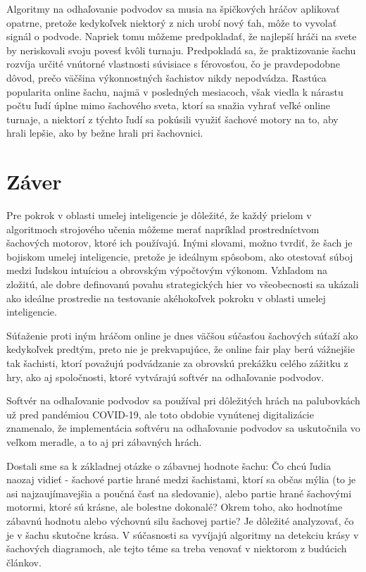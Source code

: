 \documentclass[10pt,twoside,slovak,a4paper]{article}
\begin{document}
Algoritmy na odhaľovanie podvodov sa musia na špičkových hráčov aplikovať opatrne, pretože kedykoľvek niektorý z nich urobí nový ťah, môže to vyvolať signál o podvode. Napriek tomu môžeme predpokladať, že najlepší hráči na svete by neriskovali svoju povesť kvôli turnaju. Predpokladá sa, že praktizovanie šachu rozvíja určité vnútorné vlastnosti súvisiace s férovosťou, čo je pravdepodobne dôvod, prečo väčšina výkonnostných šachistov nikdy nepodvádza. Rastúca popularita online šachu, najmä v posledných mesiacoch, však viedla k nárastu počtu ľudí úplne mimo šachového sveta, ktorí sa snažia vyhrať veľké online turnaje, a niektorí z týchto ľudí sa pokúsili využiť šachové motory na to, aby hrali lepšie, ako by bežne hrali pri šachovnici.







\section{Záver}

Pre pokrok v oblasti umelej inteligencie je dôležité, že každý prielom v algoritmoch strojového učenia môžeme merať napríklad prostredníctvom šachových motorov, ktoré ich používajú. Inými slovami, možno tvrdiť, že šach je bojiskom umelej inteligencie, pretože je ideálnym spôsobom, ako otestovať súboj medzi ľudskou intuíciou a obrovským výpočtovým výkonom. Vzhľadom na zložitú, ale dobre definovanú povahu strategických hier vo všeobecnosti sa ukázali ako ideálne prostredie na testovanie akéhokoľvek pokroku v oblasti umelej inteligencie.

Súťaženie proti iným hráčom online je dnes väčšou súčasťou šachových súťaží ako kedykoľvek predtým, preto nie je prekvapujúce, že online fair play berú vážnejšie tak šachisti, ktorí považujú podvádzanie za obrovskú prekážku celého zážitku z hry, ako aj spoločnosti, ktoré vytvárajú softvér na odhaľovanie podvodov.

Softvér na odhaľovanie podvodov sa používal pri dôležitých hrách na palubovkách už pred pandémiou COVID-19, ale toto obdobie vynútenej digitalizácie znamenalo, že implementácia softvéru na odhaľovanie podvodov sa uskutočnila vo veľkom meradle, a to aj pri zábavných hrách.

Dostali sme sa k základnej otázke o zábavnej hodnote šachu: Čo chcú ľudia naozaj vidieť - šachové partie hrané medzi šachistami, ktorí sa občas mýlia (to je asi najzaujímavejšia a poučná časť na sledovanie), alebo partie hrané šachovými motormi, ktoré sú krásne, ale bolestne dokonalé? Okrem toho, ako hodnotíme zábavnú hodnotu alebo výchovnú silu šachovej partie? Je dôležité analyzovať, čo je v šachu skutočne krása. V súčasnosti sa vyvíjajú algoritmy na detekciu krásy v šachových diagramoch, ale tejto téme sa treba venovať v niektorom z budúcich článkov.








\end{document}
